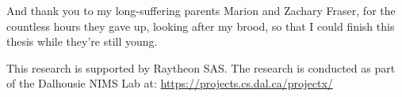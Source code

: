 \begin{acknowledgements}
And thank you to my long-suffering parents Marion and Zachary Fraser, for the
countless hours they gave up, looking after my brood, so that I could finish
this thesis while they're still young.

This research is supported by Raytheon SAS. The research is conducted
as part of the Dalhousie NIMS Lab at: \url{https://projects.cs.dal.ca/projectx/}
\end{acknowledgements}

\clearpage
\mainmatter